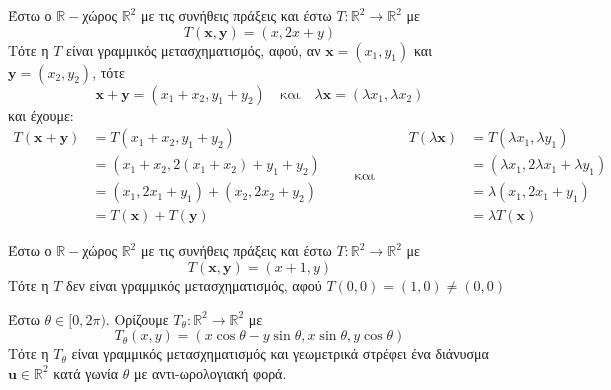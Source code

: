 \begin{example}
  Έστω ο $ \mathbb{R}- $χώρος $ \mathbb{R}^{2} $ με τις συνήθεις πράξεις και έστω 
  $ T \colon \mathbb{R}^{2} \to \mathbb{R}^{2} $ με 
  \[
    T(\mathbf{x}, \mathbf{y}) = (x,2x+y) 
  \] 
  Τότε η $T$ είναι γραμμικός μετασχηματισμός, αφού, αν $ \mathbf{x}=(x_{1}, y_{1}) $ 
  και $ \mathbf{y}=(x_{2}, y_{2}) $, τότε \[ \mathbf{x}+ \mathbf{y} = 
    (x_{1}+ x_{2}, y_{1}+ y_{2}) \quad \text{και} \quad  \lambda \mathbf{x} = 
  (\lambda x_{1}, \lambda x_{2}) \] και έχουμε:
\[
     \begin{aligned}
      T(\mathbf{x}+ \mathbf{y}) &= T(x_{1}+ x_{2}, y_{1}+ y_{2}) \\
                                &= (x_{1}+ x_{2}, 2(x_{1}+ x_{2})+ y_{1}+ y_{2}) \\
                                &= (x_{1}, 2 x_{1}+ y_{1}) + (x_{2}, 2 x_{2}+ y_{2}) \\
                                &= T(\mathbf{x}) + T(\mathbf{y}) 
    \end{aligned}
    \qquad \text{και} \qquad
    \begin{aligned}
      T(\lambda \mathbf{x}) &= T(\lambda x_{1}, \lambda y_{1}) \\
                            &= (\lambda x_{1}, 2 \lambda x_{1}+ \lambda y_{1}) \\
                            &= \lambda (x_{1}, 2 x_{1}+ y_{1}) \\
                            &= \lambda T(\mathbf{x})
    \end{aligned}
  \]
\end{example}

\begin{example}
  Έστω ο $ \mathbb{R}- $χώρος $ \mathbb{R}^{2} $ με τις συνήθεις πράξεις και έστω 
  $ T \colon \mathbb{R}^{2} \to \mathbb{R}^{2} $ με 
  \[
    T(\mathbf{x}, \mathbf{y}) = (x+1, y) 
  \] 
  Τότε η $T$ δεν είναι γραμμικός μετασχηματισμός, αφού $ T(0,0) = (1,0) \neq (0,0) $ 
\end{example}

\begin{example}
  Έστω $ \theta \in [0,2 \pi) $. Ορίζουμε $ T_{\theta} \colon \mathbb{R}^{2} \to
  \mathbb{R}^{2}  $ με 
  \[
    T_{\theta}(x,y) = (x \cos{\theta} - y \sin{\theta}, x \sin{\theta}, y \cos{\theta}) 
  \] 
  Τότε η $ T_{\theta} $ είναι γραμμικός μετασχηματισμός και γεωμετρικά στρέφει ένα 
  διάνυσμα $ \mathbf{u} \in \mathbb{R}^{2} $ κατά γωνία $\theta$ με αντι-ωρολογιακή 
  φορά.
\end{example}

